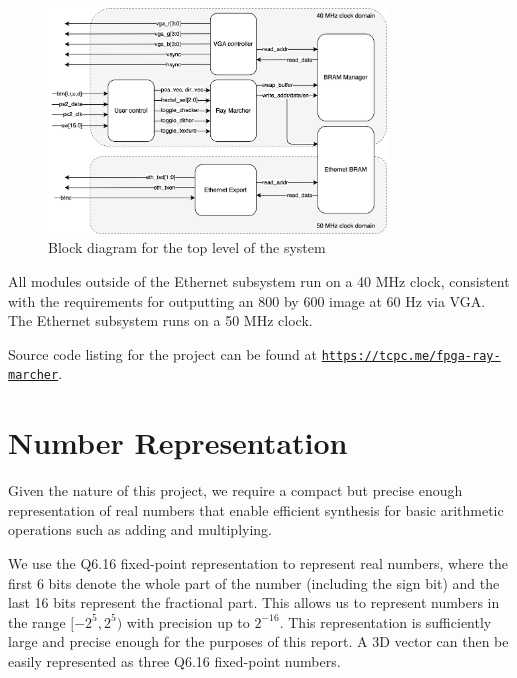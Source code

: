 \documentclass[conference]{IEEEtran}
\begin{document}
\begin{figure}
\centerline{\includegraphics[width=0.8\textwidth]{top_block_diagram.png}}
\caption{Block diagram for the top level of the system}
\label{block-diagram}
\end{figure}

All modules outside of the Ethernet subsystem run on a 40 MHz clock, consistent with the requirements for outputting an 800 by 600 image at 60 Hz via VGA. The Ethernet subsystem runs on a 50 MHz clock.

Source code listing for the project can be found at \texttt{\href{https://tcpc.me/fpga-ray-marcher}{https://tcpc.me/fpga-ray-marcher}}.


\section{Number Representation}


Given the nature of this project, we require a compact but precise enough representation of real numbers that enable efficient synthesis for basic arithmetic operations such as adding and multiplying.

We use the Q6.16 fixed-point representation to represent real numbers, where the first 6 bits denote the whole part of the number (including the sign bit) and the last 16 bits represent the fractional part. This allows us to represent numbers in the range $[-2^5, 2^5)$ with precision up to $2^{-16}$. This representation is sufficiently large and precise enough for the purposes of this report. A 3D vector can then be easily represented as three Q6.16 fixed-point numbers.
\end{document}
